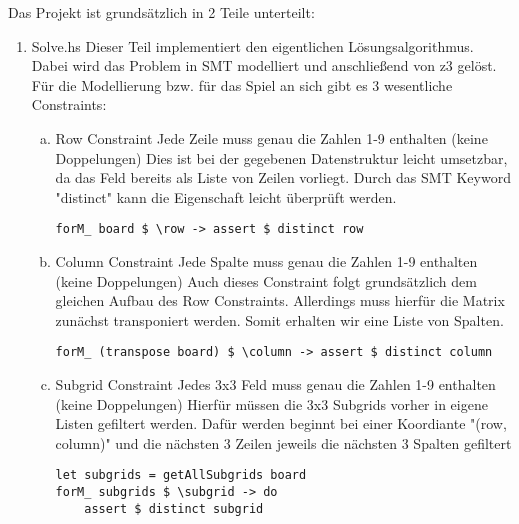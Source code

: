 Das Projekt ist grundsätzlich in 2 Teile unterteilt:
\begin{enumerate}[(1)]
    \item Solve.hs \newline
    Dieser Teil implementiert den eigentlichen Lösungsalgorithmus. Dabei wird das Problem in SMT modelliert und anschließend von z3 gelöst. Für die Modellierung bzw. für das Spiel an sich gibt es 3 wesentliche Constraints:
        \begin{enumerate}[(a)]
            \item Row Constraint \newline
            Jede Zeile muss genau die Zahlen 1-9 enthalten (keine Doppelungen)\newline
            Dies ist bei der gegebenen Datenstruktur leicht umsetzbar, da das Feld bereits als Liste von Zeilen vorliegt. Durch das SMT Keyword "distinct" kann die Eigenschaft leicht überprüft werden. \newline
            \begin{lstlisting}
forM_ board $ \row -> assert $ distinct row
            \end{lstlisting}
            \item Column Constraint \newline
            Jede Spalte muss genau die Zahlen 1-9 enthalten (keine Doppelungen) \newline
            Auch dieses Constraint folgt grundsätzlich dem gleichen Aufbau des Row Constraints. Allerdings muss hierfür die Matrix zunächst transponiert werden. Somit erhalten wir eine Liste von Spalten.
            \begin{lstlisting}
forM_ (transpose board) $ \column -> assert $ distinct column
            \end{lstlisting}
            \item Subgrid Constraint \newline
            Jedes 3x3 Feld muss genau die Zahlen 1-9 enthalten (keine Doppelungen) \newline
            Hierfür müssen die 3x3 Subgrids vorher in eigene Listen gefiltert werden. Dafür werden beginnt bei einer Koordiante "(row, column)" und die nächsten 3 Zeilen jeweils die nächsten 3 Spalten gefiltert
            \begin{lstlisting}
let subgrids = getAllSubgrids board
forM_ subgrids $ \subgrid -> do
    assert $ distinct subgrid
            \end{lstlisting}
        \end{enumerate}


\end{enumerate}

